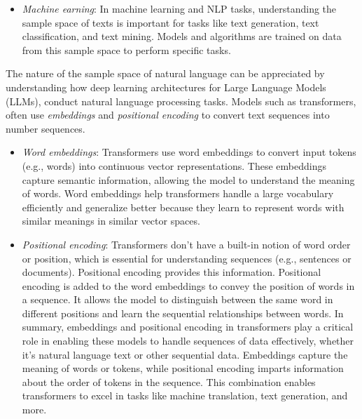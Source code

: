 \documentclass{tufte-handout}
\begin{document}
\begin{enumerate}
\begin{itemize}
\item \textit{Machine earning}: In machine learning and NLP tasks, understanding the sample space of texts is important for tasks like text generation, text classification, and text mining. Models and algorithms are trained on data from this sample space to perform specific tasks.
\end{itemize}
The nature of the sample space of natural language can be appreciated by understanding how deep learning architectures for Large Language Models (LLMs), conduct natural language processing tasks.  Models such as transformers, often use \textit{embeddings} and \textit{positional encoding} to convert text sequences into number sequences.
\begin{itemize}
\item \textit{Word embeddings}: Transformers use word embeddings to convert input tokens (e.g., words) into continuous vector representations. These embeddings capture semantic information, allowing the model to understand the meaning of words. Word embeddings help transformers handle a large vocabulary efficiently and generalize better because they learn to represent words with similar meanings in similar vector spaces.
\item \textit{Positional encoding}: Transformers don't have a built-in notion of word order or position, which is essential for understanding sequences (e.g., sentences or documents). Positional encoding provides this information. Positional encoding is added to the word embeddings to convey the position of words in a sequence. It allows the model to distinguish between the same word in different positions and learn the sequential relationships between words. In summary, embeddings and positional encoding in transformers play a critical role in enabling these models to handle sequences of data effectively, whether it's natural language text or other sequential data. Embeddings capture the meaning of words or tokens, while positional encoding imparts information about the order of tokens in the sequence. This combination enables transformers to excel in tasks like machine translation, text generation, and more.
\end{itemize}
\end{enumerate}
\end{document}
